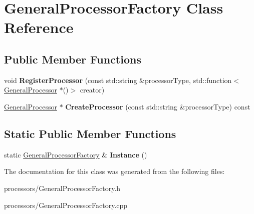 \hypertarget{classGeneralProcessorFactory}{\section{General\-Processor\-Factory Class Reference}
\label{classGeneralProcessorFactory}
}
\subsection*{Public Member Functions}
\begin{DoxyCompactItemize}
\item 
\hypertarget{classGeneralProcessorFactory_a37a1c08e8e76f05197d179a3c29f494c}{void {\bfseries Register\-Processor} (const std\-::string \&processor\-Type, std\-::function$<$ \hyperlink{classGeneralProcessor}{General\-Processor} $\ast$()$>$ creator)}\label{classGeneralProcessorFactory_a37a1c08e8e76f05197d179a3c29f494c}

\item 
\hypertarget{classGeneralProcessorFactory_aa29e6de2664a7177cc4eec049a8e9479}{\hyperlink{classGeneralProcessor}{General\-Processor} $\ast$ {\bfseries Create\-Processor} (const std\-::string \&processor\-Type) const }\label{classGeneralProcessorFactory_aa29e6de2664a7177cc4eec049a8e9479}

\end{DoxyCompactItemize}
\subsection*{Static Public Member Functions}
\begin{DoxyCompactItemize}
\item 
\hypertarget{classGeneralProcessorFactory_a765e196b59f2a197ec9776cb51465359}{static \hyperlink{classGeneralProcessorFactory}{General\-Processor\-Factory} \& {\bfseries Instance} ()}\label{classGeneralProcessorFactory_a765e196b59f2a197ec9776cb51465359}

\end{DoxyCompactItemize}


The documentation for this class was generated from the following files\-:\begin{DoxyCompactItemize}
\item 
processors/General\-Processor\-Factory.\-h\item 
processors/General\-Processor\-Factory.\-cpp\end{DoxyCompactItemize}
